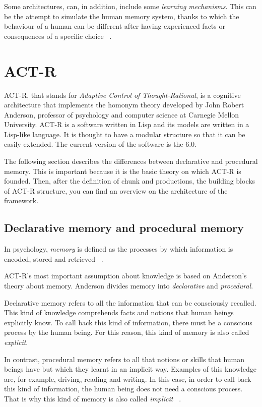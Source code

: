 	Some architectures, can, in addition, include some \emph{learning mechanisms}. This can be the attempt to simulate the human memory system, thanks to which the behaviour of a human can be different after having experienced facts or consequences of a specific choice ~\cite{Sears2012}.
	
	
  \section{ACT-R}
	\mbox{ACT-R}, that stands for \emph{Adaptive Control of Thought-Rational}, is a cognitive architecture that implements the homonym theory developed by John Robert Anderson, professor of psychology and computer science at Carnegie Mellon University. 
	\mbox{ACT-R} is a software written in Lisp and its models are written in a Lisp-like language. It is thought to have a modular structure so that it can be easily extended. The current version of the software is the 6.0. 
	
	The following section describes the differences between declarative and procedural memory. This is important because it is the basic theory on which ACT-R is founded. Then, after the definition of chunk and productions, the building blocks of ACT-R structure, you can find an overview on the architecture of the framework.
	
	\subsection{Declarative memory and procedural memory}
	In psychology, \emph{memory} is defined as the processes by which information is encoded, stored and retrieved ~\cite{baddeley2009memory}. 
	
	\mbox{ACT-R's} most important assumption about knowledge is based on Anderson's theory about memory. 
	Anderson divides memory into \emph{declarative} and \emph{procedural}. 
	
	Declarative memory refers to all the information that can be consciously recalled. This kind of knowledge comprehends facts and notions that human beings explicitly know. To call back this kind of information, there must be a conscious process by the human being. For this reason, this kind of memory is also called \emph{explicit}.
	
	In contrast, procedural memory refers to all that notions or skills that human beings have but which they learnt in an implicit way. Examples of this knowledge are, for example, driving, reading and writing. In this case, in order to call back this kind of information, the human being does not need a conscious process. That is why this kind of memory is also called \emph{implicit} ~\cite{anderson1976language}. 
	
